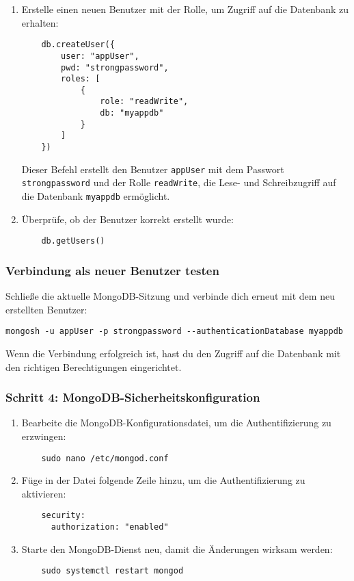 \documentclass[a4paper,12pt]{article}
\begin{document}
\begin{enumerate}
    \item Erstelle einen neuen Benutzer mit der Rolle, um Zugriff auf die Datenbank zu erhalten:

    \begin{lstlisting}
    db.createUser({
        user: "appUser",
        pwd: "strongpassword",
        roles: [
            {
                role: "readWrite",
                db: "myappdb"
            }
        ]
    })
    \end{lstlisting}
    
    Dieser Befehl erstellt den Benutzer \texttt{appUser} mit dem Passwort \texttt{strongpassword} und der Rolle \texttt{readWrite}, die Lese- und Schreibzugriff auf die Datenbank \texttt{myappdb} ermöglicht.
    
    \item Überprüfe, ob der Benutzer korrekt erstellt wurde:

    \begin{lstlisting}
    db.getUsers()
    \end{lstlisting}
\end{enumerate}

\subsubsection{Verbindung als neuer Benutzer testen}
Schließe die aktuelle MongoDB-Sitzung und verbinde dich erneut mit dem neu erstellten Benutzer:

\begin{lstlisting}
mongosh -u appUser -p strongpassword --authenticationDatabase myappdb
\end{lstlisting}

Wenn die Verbindung erfolgreich ist, hast du den Zugriff auf die Datenbank mit den richtigen Berechtigungen eingerichtet.

\subsubsection{Schritt 4: MongoDB-Sicherheitskonfiguration}
\begin{enumerate}
    \item Bearbeite die MongoDB-Konfigurationsdatei, um die Authentifizierung zu erzwingen:

    \begin{lstlisting}
    sudo nano /etc/mongod.conf
    \end{lstlisting}
    
    \item Füge in der Datei folgende Zeile hinzu, um die Authentifizierung zu aktivieren:

    \begin{lstlisting}
    security:
      authorization: "enabled"
    \end{lstlisting}
    
    \item Starte den MongoDB-Dienst neu, damit die Änderungen wirksam werden:

    \begin{lstlisting}
    sudo systemctl restart mongod
    \end{lstlisting}
\end{enumerate}
\end{document}
